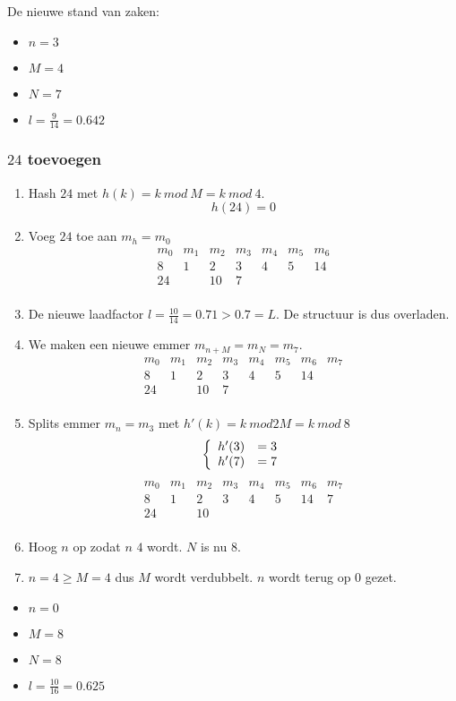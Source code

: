 \documentclass[hashing.tex]{subfiles}
\begin{document}
De nieuwe stand van zaken:
\begin{multicols}{4}
\begin{itemize}
\item $n=3$
\item $M=4$
\item $N=7$
\item $l=\frac{9}{14} = 0.642$
\end{itemize}
\end{multicols}

\subsubsection{$24$ toevoegen}
\begin{enumerate}
\item Hash $24$ met $h(k) = k\ mod\ M = k\ mod\ 4$.
\[
h(24) = 0
\]
\item Voeg $24$ toe aan $m_h = m_{0}$
\[
\begin{array}{|c|c|c|c||c|c|c|}
m_0&m_1&m_2&m_3&m_4&m_5&m_6\\
\hline
8 & 1 & 2 & 3 & 4 & 5& 14\\
24&   & 10& 7 &   &&\\
\end{array} 
\]
\item De nieuwe laadfactor $l=\frac{10}{14} = 0.71 > 0.7 = L$. De structuur is dus overladen.
\item We maken een nieuwe emmer $m_{n+M}=m_{N} = m_{7}$.
\[
\begin{array}{|c|c|c|c||c|c|c|c|}
m_0&m_1&m_2&m_3&m_4&m_5&m_6&m_7\\
\hline
8 & 1 & 2 & 3 & 4 & 5& 14&\\
24&   & 10& 7 &   &&&\\
\end{array} 
\]
\item Splits emmer $m_{n} = m_3$ met $h'(k) = k\ mod 2M = k\ mod\ 8$
\[
\left\{
\begin{array}{c c}
h'(3) &= 3\\
h'(7) &= 7
\end{array}
\right.
\]
\[
\begin{array}{|c|c|c|c||c|c|c|c|}
m_0&m_1&m_2&m_3&m_4&m_5&m_6&m_7\\
\hline
8 & 1 & 2 & 3 & 4 & 5& 14&7\\
24&   & 10&  &   &&&\\
\end{array} 
\]
\item Hoog $n$ op zodat $n$ $4$ wordt. $N$ is nu $8$.
\item $n=4\ge M=4$ dus $M$ wordt verdubbelt. $n$ wordt terug op $0$ gezet.
\end{enumerate}
\begin{multicols}{4}
\begin{itemize}
\item $n=0$
\item $M=8$
\item $N=8$
\item $l=\frac{10}{16} = 0.625$
\end{itemize}
\end{multicols}
\end{document}
